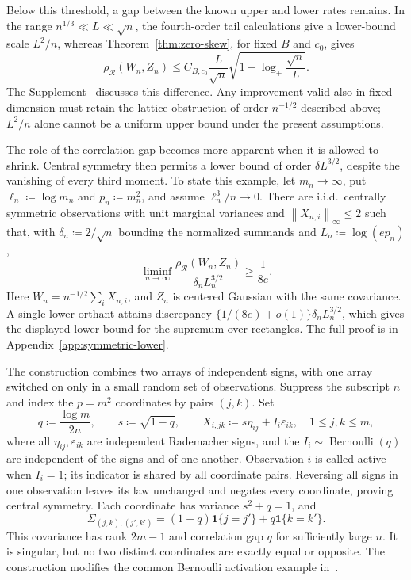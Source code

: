 \documentclass[11pt,letterpaper]{article}
\theoremstyle{remark}
\newcommand{\norm}[1]{\left\lVert#1\right\rVert}
\newcommand{\rh}{\rho_{\mathcal R}}
\newcommand{\ind}{\mathbf 1}
\begin{document}
Below this threshold, a gap between the known upper and lower rates
remains. In the range \(n^{1/3}\ll L\ll\sqrt n\), the fourth-order
tail calculations give a lower-bound scale \(L^2/n\), whereas
Theorem~\ref{thm:zero-skew}, for fixed \(B\) and \(c_0\), gives
\[
 \rh(W_n,Z_n)\le C_{B,c_0}\frac L{\sqrt n}
       \sqrt{1+\log_+\frac{\sqrt n}{L}}.
\]
The Supplement~\cite[Section~S.3.1]{Supplement} discusses this
difference. Any improvement valid also in fixed dimension must retain
the lattice obstruction of order \(n^{-1/2}\) described above;
\(L^2/n\) alone cannot be a uniform upper bound under the present
assumptions.

The role of the correlation gap becomes more apparent when it is
allowed to shrink. Central symmetry then permits a lower bound of
order \(\delta L^{3/2}\), despite the vanishing of every third moment.
To state this example, let \(m_n\to\infty\), put
\(\ell_n\coloneqq\log m_n\) and \(p_n\coloneqq m_n^2\), and assume
\(\ell_n^3/n\to0\). There are i.i.d.\ centrally symmetric observations
with unit marginal variances and \(\norm{X_{n,i}}_\infty\le2\) such
that, with \(\delta_n\coloneqq2/\sqrt n\) bounding the normalized
summands and \(L_n\coloneqq\log(ep_n)\),
\[
 \liminf_{n\to\infty}
 \frac{\rh(W_n,Z_n)}{\delta_n L_n^{3/2}}\ge\frac1{8e}.
\]
Here \(W_n=n^{-1/2}\sum_iX_{n,i}\), and \(Z_n\) is centered Gaussian
with the same covariance. A single lower orthant attains discrepancy
\(\{1/(8e)+o(1)\}\delta_nL_n^{3/2}\), which gives the displayed
lower bound for the supremum over rectangles. The full proof is in
Appendix~\ref{app:symmetric-lower}.

The construction combines two arrays of independent signs, with one
array switched on only in a small random set of observations.
Suppress the subscript \(n\) and index the \(p=m^2\) coordinates by
pairs \((j,k)\). Set
\[
 q\coloneqq\frac{\log m}{2n},\qquad s\coloneqq\sqrt{1-q},
 \qquad X_{i,jk}\coloneqq s\eta_{ij}+I_i\varepsilon_{ik},
 \quad 1\le j,k\le m,
\]
where all \(\eta_{ij},\varepsilon_{ik}\) are independent Rademacher
signs, and the \(I_i\sim\operatorname{Bernoulli}(q)\) are independent
of the signs and of one another. Observation \(i\) is called active
when \(I_i=1\); its indicator is shared by all coordinate pairs.
Reversing all signs in one observation leaves its law unchanged and
negates every coordinate, proving central symmetry. Each coordinate
has variance \(s^2+q=1\), and
\[
 \Sigma_{(j,k),(j',k')}=(1-q)\ind\{j=j'\}+q\ind\{k=k'\}.
\]
This covariance has rank \(2m-1\) and correlation gap \(q\) for
sufficiently large \(n\). It is singular, but no two distinct
coordinates are exactly equal or opposite. The construction modifies
the common Bernoulli activation example
in~\cite[Proposition~E.1]{FKLZ}.
\end{document}
